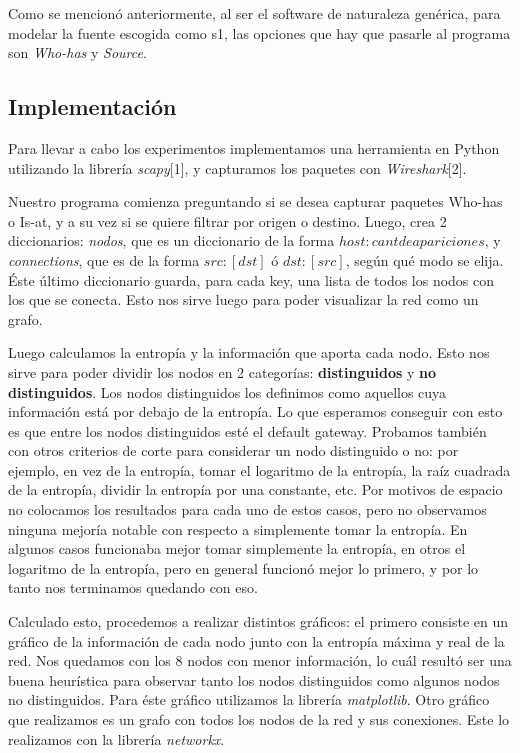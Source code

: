 Como se mencionó anteriormente, al ser el software de naturaleza genérica, para modelar la fuente escogida como s1, las opciones que hay que pasarle al programa son \textit{Who-has} y \textit{Source}.


\subsection{Implementación}
Para llevar a cabo los experimentos implementamos una herramienta en Python utilizando la librería \textit{scapy}[1], y capturamos los paquetes con \textit{Wireshark}[2].

Nuestro programa comienza preguntando si se desea capturar paquetes Who-has o Is-at, y a su vez si se quiere filtrar por origen o destino. Luego, crea 2 diccionarios: \textit{nodos}, que es un diccionario de la forma ${host: cant de apariciones}$, y \textit{connections}, que es de la forma ${src: [dst] }$ ó ${dst: [src] }$, según qué modo se elija. Éste último diccionario guarda, para cada key, una lista de todos los nodos con los que se conecta. Esto nos sirve luego para poder visualizar la red como un grafo.

Luego calculamos la entropía y la información que aporta cada nodo. Esto nos sirve para poder dividir los nodos en 2 categorías: \textbf{distinguidos} y \textbf{no distinguidos}. Los nodos distinguidos los definimos como aquellos cuya información está por debajo de la entropía. Lo que esperamos conseguir con esto es que entre los nodos distinguidos esté el default gateway. Probamos también con otros criterios de corte para considerar un nodo distinguido o no: por ejemplo, en vez de la entropía, tomar el logaritmo de la entropía, la raíz cuadrada de la entropía, dividir la entropía por una constante, etc. Por motivos de espacio no colocamos los resultados para cada uno de estos casos, pero no observamos ninguna mejoría notable con respecto a simplemente tomar la entropía. En algunos casos funcionaba mejor tomar simplemente la entropía, en otros el logaritmo de la entropía, pero en general funcionó mejor lo primero, y por lo tanto nos terminamos quedando con eso.

Calculado esto, procedemos a realizar distintos gráficos: el primero consiste en un gráfico de la información de cada nodo junto con la entropía máxima y real de la red. Nos quedamos con los 8 nodos con menor información, lo cuál resultó ser una buena heurística para observar tanto los nodos distinguidos como algunos nodos no distinguidos. Para éste gráfico utilizamos la librería \textit{matplotlib}. Otro gráfico que realizamos es un grafo con todos los nodos de la red y sus conexiones. Este lo realizamos con la librería \textit{networkx}.

